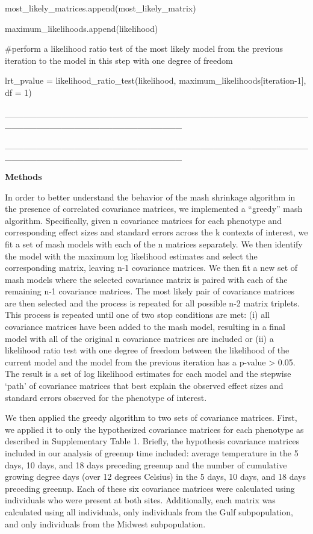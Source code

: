 \documentclass[
  letterpaper,
  DIV=11,
  numbers=noendperiod]{scrartcl}
\begin{document}
most\_likely\_matrices.append(most\_likely\_matrix)

maximum\_likelihoods.append(likelihood)

\hfill\break

\#perform a likelihood ratio test of the most likely model from the
previous iteration to the model in this step with one degree of freedom

lrt\_pvalue = likelihood\_ratio\_test(likelihood,
maximum\_likelihoods{[}iteration-1{]}, df = 1)

\_\_\_\_\_\_\_\_\_\_\_\_\_\_\_\_\_\_\_\_\_\_\_\_\_\_\_\_\_\_\_\_\_\_\_\_\_\_\_\_\_\_\_\_\_\_\_\_\_\_\_\_\_\_\_\_\_\_\_\_\_\_\_\_\_\_\_\_\_\_\_\_\_\_\_\_

\_\_\_\_\_\_\_\_\_\_\_\_\_\_\_\_\_\_\_\_\_\_\_\_\_\_\_\_\_\_\_\_\_\_\_\_\_\_\_\_\_\_\_\_\_\_\_\_\_\_\_\_\_\_\_\_\_\_\_\_\_\_\_\_\_\_\_\_\_\_\_\_\_\_\_\_

\hfill\break

\textbf{Methods}

In order to better understand the behavior of the mash shrinkage
algorithm in the presence of correlated covariance matrices, we
implemented a ``greedy'' mash algorithm. Specifically, given n
covariance matrices for each phenotype and corresponding effect sizes
and standard errors across the k contexts of interest, we fit a set of
mash models with each of the n matrices separately. We then identify the
model with the maximum log likelihood estimates and select the
corresponding matrix, leaving n-1 covariance matrices. We then fit a new
set of mash models where the selected covariance matrix is paired with
each of the remaining n-1 covariance matrices. The most likely pair of
covariance matrices are then selected and the process is repeated for
all possible n-2 matrix triplets. This process is repeated until one of
two stop conditions are met: (i) all covariance matrices have been added
to the mash model, resulting in a final model with all of the original n
covariance matrices are included or (ii) a likelihood ratio test with
one degree of freedom between the likelihood of the current model and
the model from the previous iteration has a p-value \textgreater{} 0.05.
The result is a set of log likelihood estimates for each model and the
stepwise `path' of covariance matrices that best explain the observed
effect sizes and standard errors observed for the phenotype of
interest.~

\hfill\break

We then applied the greedy algorithm to two sets of covariance matrices.
First, we applied it to only the hypothesized covariance matrices for
each phenotype as described in Supplementary Table 1. Briefly, the
hypothesis covariance matrices included in our analysis of greenup time
included: average temperature in the 5 days, 10 days, and 18 days
preceding greenup and the number of cumulative growing degree days (over
12 degrees Celsius) in the 5 days, 10 days, and 18 days preceding
greenup. Each of these six covariance matrices were calculated using
individuals who were present at both sites. Additionally, each matrix
was calculated using all individuals, only individuals from the Gulf
subpopulation, and only individuals from the Midwest subpopulation.
\end{document}
